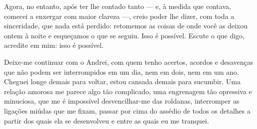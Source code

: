 
Agora, no entanto, após ter lhe contado tanto --- e, à medida que
contava, comecei a enxergar com maior clareza ---, creio poder lhe
dizer, com toda a sinceridade, que nada está perdido: retomemos as
coisas de onde você as deixou ontem à noite e esqueçamos o que se
seguiu. Isso é possível. Escute o que digo, acredite em mim: isso é
possível.

Deixe-me continuar com o Andrei, com quem tenho acertos, acordos e
desavenças que não podem ser interrompidos em um dia, nem em dois, nem
em um ano. Cheguei longe demais para voltar, estou cansada demais para
sucumbir. Uma relação amorosa me parece algo tão complicado, uma
engrenagem tão opressiva e minuciosa, que me é impossível
desvencilhar-me das roldanas, interromper as ligações miúdas que me
fixam, passar por cima do assédio de todos os detalhes a partir dos
quais ela se desenvolveu e entre as quais eu me tranquei.

